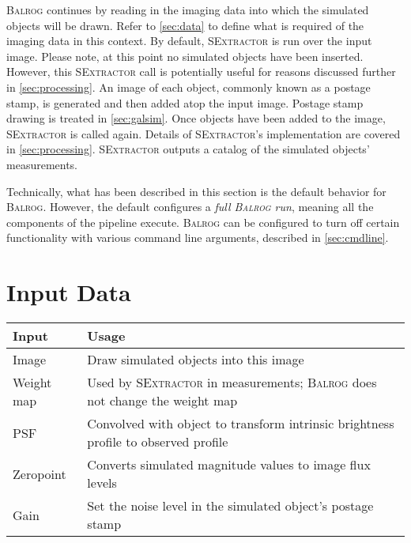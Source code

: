 \documentclass[11pt]{book}
\newcommand{\balrog}{\textsc{Balrog}}
\newcommand{\sex}{\textsc{SExtractor}}
\begin{document}
\balrog{} continues by reading in the imaging data into which the simulated objects will be drawn.
Refer to \autoref{sec:data} to define what is required of the imaging data in this context.
By default, \sex{} is run over the input image. Please note, at this point no simulated
objects have been inserted. However, this \sex{} call is potentially useful
for reasons discussed further in \autoref{sec:processing}.
An image of each object, commonly known as a postage stamp, is generated and then added atop the input image.
Postage stamp drawing is treated in \autoref{sec:galsim}.
Once objects have been added to the image, \sex{} is called again.
Details of \sex{}'s implementation are covered in \autoref{sec:processing}.
\sex{} outputs a catalog of the simulated objects' measurements.

Technically, what has been described in this section is the default behavior for \balrog{}.
However, the default configures a \textit{full \balrog{} run}, 
meaning all the components of the pipeline execute.
\balrog{} can be configured to turn off certain functionality with various command line arguments,
described in \autoref{sec:cmdline}.



\section{Input Data}
\label{sec:data}


\begin{table}
\caption{Brief summary of imaging inputs to \balrog{}.}
\label{tab:input}
\begin{longtabu} to \textwidth {l X}
\toprule %
{} \textbf{Input} & \textbf{Usage} \\ \midrule
Image & Draw simulated objects into this image\\
Weight map & Used by \sex{} in measurements; \balrog{} does not change the weight map\\
PSF & Convolved with object to transform intrinsic brightness profile to observed profile\\
Zeropoint & Converts simulated magnitude values to image flux levels\\
Gain & Set the noise level in the simulated object's postage stamp\\
\bottomrule %
\end{longtabu}
\end{table}
\end{document}
